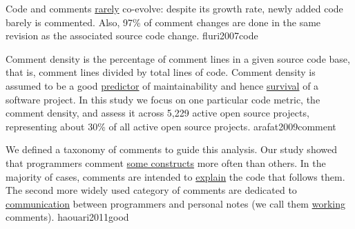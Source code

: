 \documentclass{article}
\begin{document}
  {Code and comments \ul{rarely} co-evolve: despite its growth rate, newly added code barely is commented. Also, 97\% of comment changes are done in the same revision as the associated source code change.}
  {fluri2007code}

  {Comment density is the percentage of comment lines in a given source code base, that is, comment lines divided by total lines of code. Comment density is assumed to be a good \ul{predictor} of maintainability and hence \ul{survival} of a software project. In this study we focus on one particular code metric, the comment density, and assess it across 5,229 active open source projects, representing about 30\% of all active open source projects.}
  {arafat2009comment}


  {We defined a taxonomy of comments to guide this analysis. Our study showed that programmers comment \ul{some constructs} more often than others. In the majority of cases, comments are intended to \ul{explain} the code that follows them. The second more widely used category of comments are dedicated to \ul{communication} between programmers and personal notes (we call them \ul{working} comments).}
  {haouari2011good}

\end{document}
